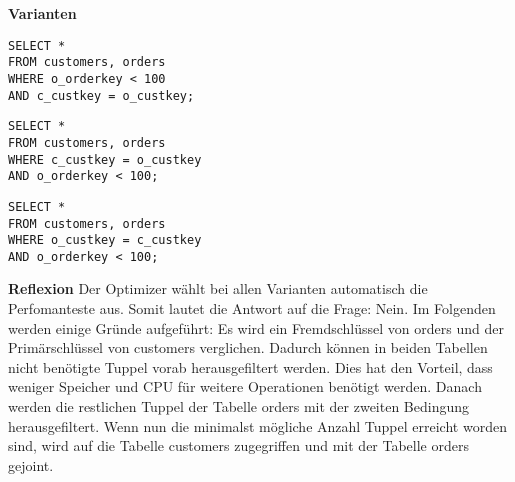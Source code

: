 \documentclass[10pt]{article}
\begin{document}
\textbf{Varianten}
\begin{lstlisting}[style=sql]
SELECT *
FROM customers, orders
WHERE o_orderkey < 100
AND c_custkey = o_custkey;
\end{lstlisting}
\begin{lstlisting}[style=sql]
SELECT *
FROM customers, orders
WHERE c_custkey = o_custkey
AND o_orderkey < 100;
\end{lstlisting}
\begin{lstlisting}[style=sql]
SELECT *
FROM customers, orders
WHERE o_custkey = c_custkey
AND o_orderkey < 100;
\end{lstlisting}
\textbf{Reflexion} \newline
Der Optimizer wählt bei allen Varianten automatisch die Perfomanteste aus. Somit lautet die Antwort auf die Frage: Nein.
Im Folgenden werden einige Gründe aufgeführt:
Es wird ein Fremdschlüssel von orders und der Primärschlüssel von customers verglichen.
Dadurch können in beiden Tabellen nicht benötigte Tuppel vorab herausgefiltert werden.
Dies hat den Vorteil, dass weniger Speicher und CPU für weitere Operationen benötigt werden.
Danach werden die restlichen Tuppel der Tabelle orders mit der zweiten Bedingung herausgefiltert.
Wenn nun die minimalst mögliche Anzahl Tuppel erreicht worden sind, wird auf die Tabelle
customers zugegriffen und mit der Tabelle orders gejoint.

\end{document}
